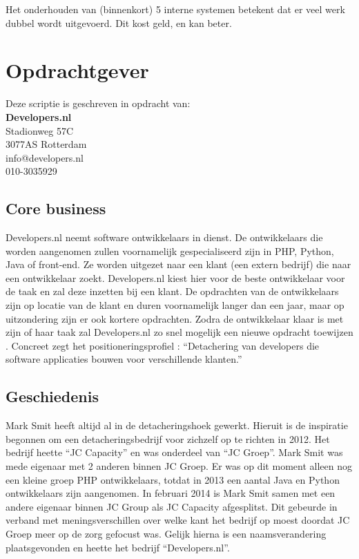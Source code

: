 Het onderhouden van (binnenkort) 5 interne systemen betekent dat er veel werk dubbel wordt uitgevoerd. Dit kost geld, en kan beter.

\pagebreak

\section{Opdrachtgever}

Deze scriptie is geschreven in opdracht van:\\[0.3cm]
\textbf{Developers.nl}\\
Stadionweg 57C\\
3077AS Rotterdam\\
info@developers.nl\\
010-3035929\\

\subsection{Core business}
Developers.nl neemt software ontwikkelaars in dienst. De ontwikkelaars die worden aangenomen zullen voornamelijk gespecialiseerd zijn in PHP, Python, Java of front-end. Ze worden uitgezet naar een klant (een extern bedrijf) die naar een ontwikkelaar zoekt. Developers.nl kiest hier voor de beste ontwikkelaar voor de taak en zal deze inzetten bij een klant. De opdrachten van de ontwikkelaars zijn op locatie van de klant en duren voornamelijk langer dan een jaar, maar op uitzondering zijn er ook kortere opdrachten. Zodra de ontwikkelaar klaar is met zijn of haar taak zal Developers.nl zo snel mogelijk een nieuwe opdracht toewijzen \parencite{Stageplan}. Concreet zegt het positioneringsprofiel \parencite{Positioneringsprofiel}: \enquote{Detachering van developers die software applicaties bouwen voor verschillende klanten.}

\subsection{Geschiedenis}
Mark Smit heeft altijd al in de detacheringshoek gewerkt. Hieruit is de inspiratie begonnen om een detacheringsbedrijf voor zichzelf op te richten in 2012. Het bedrijf heette \enquote{JC Capacity} en was onderdeel van \enquote{JC Groep}. Mark Smit was mede eigenaar met 2 anderen binnen JC Groep. Er was op dit moment alleen nog een kleine groep PHP ontwikkelaars, totdat in 2013 een aantal Java en Python ontwikkelaars zijn aangenomen. In februari 2014 is Mark Smit samen met een andere eigenaar binnen JC Group als JC Capacity afgesplitst. Dit gebeurde in verband met meningsverschillen over welke kant het bedrijf op moest doordat JC Groep meer op de zorg gefocust was. Gelijk hierna is een naamsverandering plaatsgevonden en heette het bedrijf \enquote{Developers.nl}.

